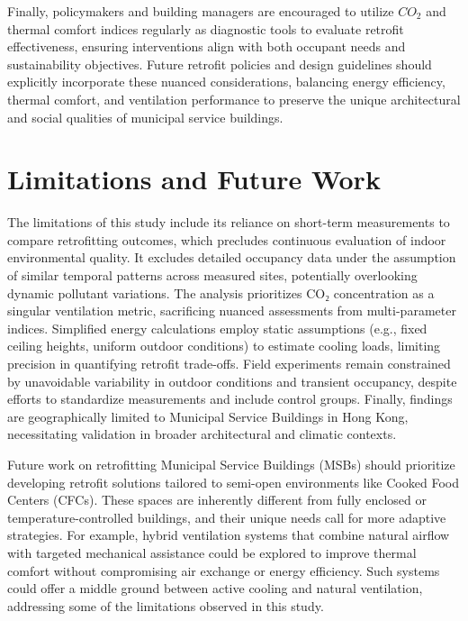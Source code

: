 \documentclass[preprint,12pt]{elsarticle}
\begin{document}
Finally, policymakers and building managers are encouraged to utilize $CO_2$ and thermal comfort indices regularly as diagnostic tools to evaluate retrofit effectiveness, ensuring interventions align with both occupant needs and sustainability objectives. Future retrofit policies and design guidelines should explicitly incorporate these nuanced considerations, balancing energy efficiency, thermal comfort, and ventilation performance to preserve the unique architectural and social qualities of municipal service buildings.

\section{Limitations and Future Work}


The limitations of this study include its reliance on short-term measurements to compare retrofitting outcomes, which precludes continuous evaluation of indoor environmental quality. It excludes detailed occupancy data under the assumption of similar temporal patterns across measured sites, potentially overlooking dynamic pollutant variations. The analysis prioritizes CO₂ concentration as a singular ventilation metric, sacrificing nuanced assessments from multi-parameter indices. Simplified energy calculations employ static assumptions (e.g., fixed ceiling heights, uniform outdoor conditions) to estimate cooling loads, limiting precision in quantifying retrofit trade-offs. Field experiments remain constrained by unavoidable variability in outdoor conditions and transient occupancy, despite efforts to standardize measurements and include control groups. Finally, findings are geographically limited to Municipal Service Buildings in Hong Kong, necessitating validation in broader architectural and climatic contexts.

Future work on retrofitting Municipal Service Buildings (MSBs) should prioritize developing retrofit solutions tailored to semi-open environments like Cooked Food Centers (CFCs). These spaces are inherently different from fully enclosed or temperature-controlled buildings, and their unique needs call for more adaptive strategies. For example, hybrid ventilation systems that combine natural airflow with targeted mechanical assistance could be explored to improve thermal comfort without compromising air exchange or energy efficiency\cite{39}. Such systems could offer a middle ground between active cooling and natural ventilation, addressing some of the limitations observed in this study.
\end{document}

